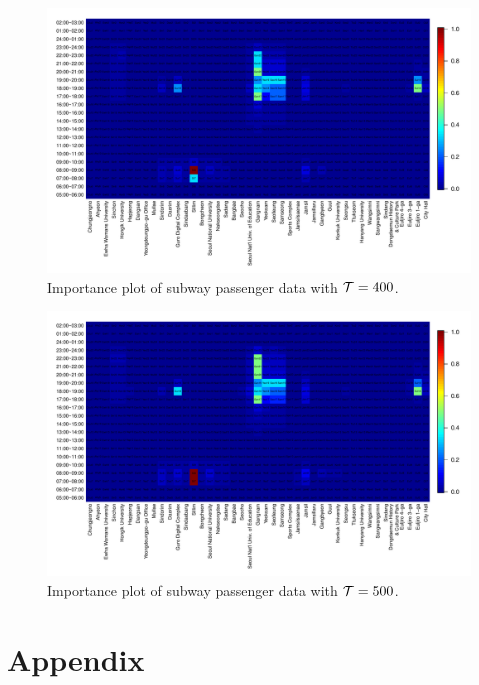 \documentclass[preprint, review, 12pt]{article}
\theoremstyle{definition}
\theoremstyle{remark}
\begin{document}
\begin{figure}
	\centering
	\includegraphics[width=1.05\textwidth]{Fig/In_scale_5.pdf}
	\vspace{-13mm}
	\caption{Importance plot of subway passenger data with ${\cal T}=400$.}
	\label{snow:subway_in_4}
\end{figure}	

\begin{figure}
	\centering
	\includegraphics[width=1.05\textwidth]{Fig/In_scale_6.pdf}
	\vspace{-13mm}
	\caption{Importance plot of subway passenger data with ${\cal T}=500$.}
	\label{snow:subway_in_5}
\end{figure}	


\section*{Appendix}
\end{document}
